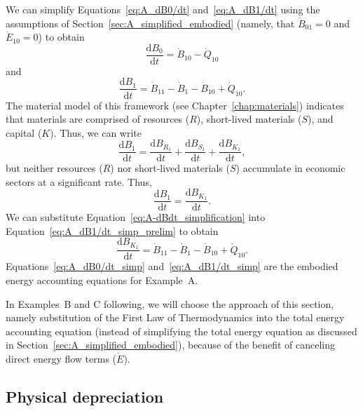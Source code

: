 We can simplify 
Equations~\ref{eq:A_dB0/dt} and~\ref{eq:A_dB1/dt} 
using the assumptions of Section~\ref{sec:A_simplified_embodied} 
(namely, that $\dot{B}_{01} = 0$ and $\dot{E}_{10} = 0$)
to obtain
%
\begin{equation} \label{eq:A_dB0/dt_simp}
	\frac{\mathrm{d}B_{0}}{\mathrm{d}t} 
	= \dot{B}_{10} 
	- \dot{Q}_{10}
\end{equation}
%
and
%
\begin{equation} \label{eq:A_dB1/dt_simp_prelim}
	\frac{\mathrm{d}B_{1}}{\mathrm{d}t} 
	= \dot{B}_{11}
	- \dot{B}_{1}
	- \dot{B}_{10}
	+ \dot{Q}_{10}.
\end{equation}
%
The material model of this framework (see Chapter~\ref{chap:materials})
indicates that materials are comprised of 
resources ($R$), 
short-lived materials ($S$), and
capital ($K$).
Thus, we can write 
%
\begin{equation}
	\frac{\mathrm{d}B_{1}}{\mathrm{d}t} 
	= \frac{\mathrm{d}B_{R_{1}}}{\mathrm{d}t} 
	+ \frac{\mathrm{d}B_{S_{1}}}{\mathrm{d}t} 
	+ \frac{\mathrm{d}B_{K_{1}}}{\mathrm{d}t},
\end{equation}
%
but neither resources ($R$) nor short-lived
materials ($S$) accumulate in economic sectors at a significant rate.
Thus, 
%
\begin{equation} \label{eq:A-dBdt_simplification}
	\frac{\mathrm{d}B_{1}}{\mathrm{d}t} 
	= \frac{\mathrm{d}B_{K_{1}}}{\mathrm{d}t}.
\end{equation}
%
We can substitute Equation~\ref{eq:A-dBdt_simplification}
into Equation~\ref{eq:A_dB1/dt_simp_prelim} to obtain
%
\begin{equation} \label{eq:A_dB1/dt_simp}
	\frac{\mathrm{d}B_{K_{1}}}{\mathrm{d}t}
	= \dot{B}_{11}
	- \dot{B}_{1}
	- \dot{B}_{10}
	+ \dot{Q}_{10}.
\end{equation}
%
Equations~\ref{eq:A_dB0/dt_simp} and~\ref{eq:A_dB1/dt_simp} are 
the embodied energy accounting equations for Example~A.

In Examples~B and C following, we will choose the approach of 
this section, namely substitution of the 
First Law of Thermodynamics
into the total energy accounting equation
(instead of simplifying the total energy equation 
as discussed in Section~\ref{sec:A_simplified_embodied}),
because of the benefit of canceling direct energy flow terms ($\dot{E}$). 


\subsection{Physical depreciation}
\label{sec:depreciation_embodied}

